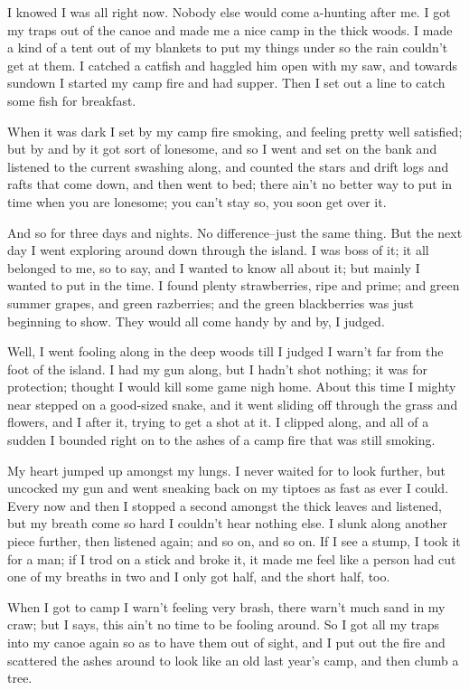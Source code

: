 I knowed I was all right now.  Nobody else would come a-hunting after me.
I got my traps out of the canoe and made me a nice camp in the thick
woods.  I made a kind of a tent out of my blankets to put my things under
so the rain couldn't get at them.  I catched a catfish and haggled him
open with my saw, and towards sundown I started my camp fire and had
supper.  Then I set out a line to catch some fish for breakfast.

When it was dark I set by my camp fire smoking, and feeling pretty well
satisfied; but by and by it got sort of lonesome, and so I went and set
on the bank and listened to the current swashing along, and counted the
stars and drift logs and rafts that come down, and then went to bed;
there ain't no better way to put in time when you are lonesome; you can't
stay so, you soon get over it.

And so for three days and nights.  No difference--just the same thing.
But the next day I went exploring around down through the island.  I was
boss of it; it all belonged to me, so to say, and I wanted to know all
about it; but mainly I wanted to put in the time.  I found plenty
strawberries, ripe and prime; and green summer grapes, and green
razberries; and the green blackberries was just beginning to show.  They
would all come handy by and by, I judged.

Well, I went fooling along in the deep woods till I judged I warn't far
from the foot of the island.  I had my gun along, but I hadn't shot
nothing; it was for protection; thought I would kill some game nigh home.
About this time I mighty near stepped on a good-sized snake, and it went
sliding off through the grass and flowers, and I after it, trying to get
a shot at it. I clipped along, and all of a sudden I bounded right on to
the ashes of a camp fire that was still smoking.

My heart jumped up amongst my lungs.  I never waited for to look further,
but uncocked my gun and went sneaking back on my tiptoes as fast as ever
I could.  Every now and then I stopped a second amongst the thick leaves
and listened, but my breath come so hard I couldn't hear nothing else.  I
slunk along another piece further, then listened again; and so on, and so
on.  If I see a stump, I took it for a man; if I trod on a stick and
broke it, it made me feel like a person had cut one of my breaths in two
and I only got half, and the short half, too.

When I got to camp I warn't feeling very brash, there warn't much sand in
my craw; but I says, this ain't no time to be fooling around.  So I got
all my traps into my canoe again so as to have them out of sight, and I
put out the fire and scattered the ashes around to look like an old last
year's camp, and then clumb a tree.

